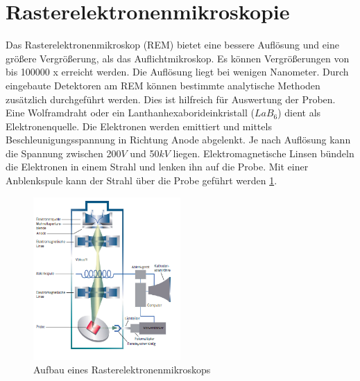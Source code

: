 \documentclass[a4paper, 11pt]{tubsreprt}
\begin{document}
\section{Rasterelektronenmikroskopie}
Das Rasterelektronenmikroskop (REM) bietet eine bessere Auflösung und eine größere Vergrößerung, als das Auflichtmikroskop. Es können Vergrößerungen von bis 100000 x erreicht werden. Die Auflösung liegt bei wenigen Nanometer. Durch eingebaute Detektoren am REM können bestimmte analytische Methoden zusätzlich  durchgeführt werden. Dies ist hilfreich für Auswertung der Proben.
Eine Wolframdraht oder ein Lanthanhexaborideinkristall ($LaB_{6}$) dient als Elektronenquelle. Die Elektronen werden emittiert und mittels Beschleunigungsspannung in Richtung Anode abgelenkt. Je nach Auflösung kann die Spannung zwischen 200$V$ und 50$kV$ liegen. Elektromagnetische Linsen bündeln die Elektronen in einem Strahl und lenken ihn auf die Probe. Mit einer Anblenkspule kann der Strahl über die Probe geführt werden \ref{REM Aufbau}.

\begin{figure} %
\centering
\includegraphics[width=0.5\textwidth]{Bilder/REM.png}
\caption{Aufbau eines Rasterelektronenmikroskops}
\label{REM Aufbau}
\end{figure}
\end{document}
